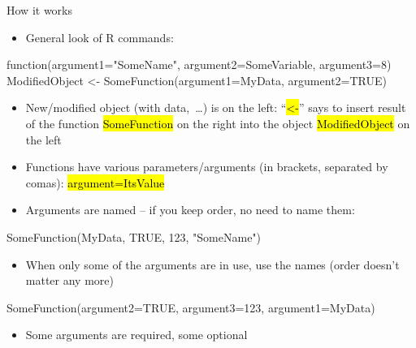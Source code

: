 \documentclass[compress, ucs, xelatex, 11pt, xcolor=svgnames,
  hyperref={
    bookmarks=true,
    unicode=true,
    colorlinks=true,
    pdftitle={Molecular data in R},
    plainpages=false,
    pdfauthor={Vojtech Zeisek},
    pdfsubject={Course about phylogeny and evolution in R},
    pdfcreator={XeLaTeX},
    pdfkeywords={R, evolution, phylogeny, molecular data},
    linkcolor=Tomato,
    anchorcolor=SaddleBrown,
    citecolor=Goldenrod,
    filecolor=DarkMagenta,
    menucolor=Sienna,
    urlcolor=DarkTurquoise,
    pdftex},
  url={hyphens, lowtilde} %
  ]{beamer}
\renewcommand{\texttt}[1]{\hl{\ttfamily #1}}
\begin{document}
\begin{frame}[fragile]{How it works}
  \begin{itemize}
    \item General look of R commands:
  \end{itemize}
  \begin{spluscode}
    function(argument1="SomeName", argument2=SomeVariable, argument3=8)
    ModifiedObject <- SomeFunction(argument1=MyData, argument2=TRUE)
  \end{spluscode}
  \begin{itemize}
    \item New/modified object (with data,~\ldots) is on the left: ``\texttt{<-}'' says to insert result of the function \texttt{SomeFunction} on the right into the object \texttt{ModifiedObject} on the left
    \item Functions have various parameters/arguments (in brackets, separated by comas): \texttt{argument=ItsValue}
    \item Arguments are named -- if you keep order, no need to name them:
  \end{itemize}
  \begin{spluscode}
    SomeFunction(MyData, TRUE, 123, "SomeName")
  \end{spluscode}
  \begin{itemize}
    \item When only some of the arguments are in use, use the names (order doesn't matter any more)
  \end{itemize}
  \begin{spluscode}
    SomeFunction(argument2=TRUE, argument3=123, argument1=MyData)
  \end{spluscode}
  \begin{itemize}
    \item Some arguments are required, some optional
  \end{itemize}
\end{frame}
\end{document}
